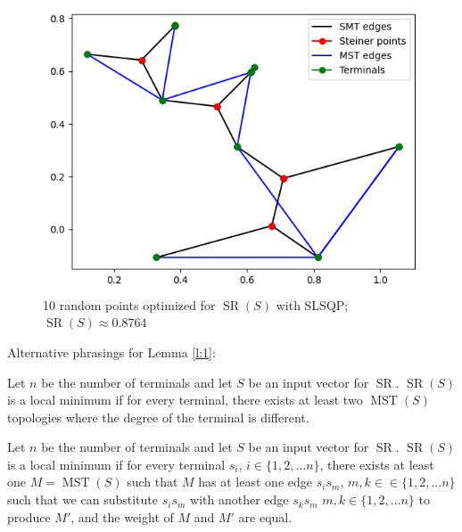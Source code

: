 \documentclass{mpaper}
\begin{document}
\begin{figure}[h!]
  \begin{center}
  \includegraphics[scale=0.5]{plot8764.png}
  \end{center}
  \caption{\label{fig:9}10 random points optimized for $\operatorname{SR}(S)$ with SLSQP; $\operatorname{SR}(S)\approx 0.8764$}
\end{figure}

Alternative phrasings for Lemma \ref{l:1}:

\begin{lemma}
  Let $n$ be the number of terminals and let $S$ be an input vector for $\operatorname{SR}$. $\operatorname{SR}(S)$ is a local minimum if for every terminal, there exists at least two $\operatorname{MST}(S)$ topologies where the degree of the terminal is different.
\end{lemma}
\begin{lemma}
  Let $n$ be the number of terminals and let $S$ be an input vector for $\operatorname{SR}$. $\operatorname{SR}(S)$ is a local minimum if for every terminal $s_i$, $i\in\{1,2,\dots n\}$, there exists at least one $M=\operatorname{MST}(S)$ such that $M$ has at least one edge $s_is_m$, $m, k\in \in\{1,2,\dots n\}$ such that we can substitute $s_is_m$ with another edge $s_ks_m$  $m, k\in\{1,2,\dots n\}$ to produce $M'$, and the weight of $M$ and $M'$ are equal.
\end{lemma}
\end{document}
